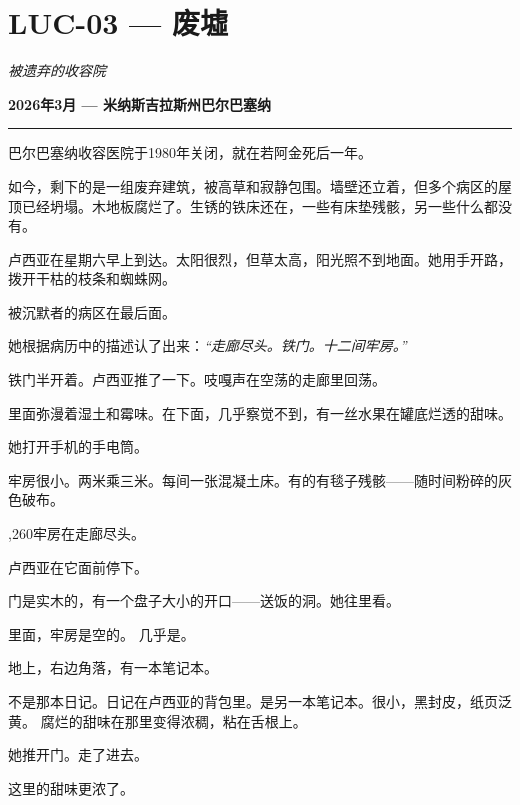 \section*{\textbf{LUC-03} --- 废墟}

\noindent \textit{被遗弃的收容院}

\noindent \textbf{2026年3月 --- 米纳斯吉拉斯州巴尔巴塞纳}

\vspace{0.5em}\noindent\rule{\textwidth}{0.5pt}\vspace{0.5em}

\noindent 巴尔巴塞纳收容医院于1980年关闭，就在若阿金死后一年。

\noindent 如今，剩下的是一组废弃建筑，被高草和寂静包围。墙壁还立着，但多个病区的屋顶已经坍塌。木地板腐烂了。生锈的铁床还在，一些有床垫残骸，另一些什么都没有。

\noindent 卢西亚在星期六早上到达。太阳很烈，但草太高，阳光照不到地面。她用手开路，拨开干枯的枝条和蜘蛛网。

\noindent 被沉默者的病区在最后面。

\noindent 她根据病历中的描述认了出来：\textit{\textquotedblleft{}走廊尽头。铁门。十二间牢房。\textquotedblright{}}

\noindent 铁门半开着。卢西亚推了一下。吱嘎声在空荡的走廊里回荡。

\noindent 里面弥漫着湿土和霉味。在下面，几乎察觉不到，有一丝水果在罐底烂透的甜味。

\noindent 她打开手机的手电筒。

\noindent 牢房很小。两米乘三米。每间一张混凝土床。有的有毯子残骸——随时间粉碎的灰色破布。

,260牢房在走廊尽头。

\noindent 卢西亚在它面前停下。

\noindent 门是实木的，有一个盘子大小的开口——送饭的洞。她往里看。

\noindent 里面，牢房是空的。
\noindent 几乎是。

\noindent 地上，右边角落，有一本笔记本。

\noindent 不是那本日记。日记在卢西亚的背包里。是另一本笔记本。很小，黑封皮，纸页泛黄。
\noindent 腐烂的甜味在那里变得浓稠，粘在舌根上。

\noindent 她推开门。走了进去。

\noindent 这里的甜味更浓了。

